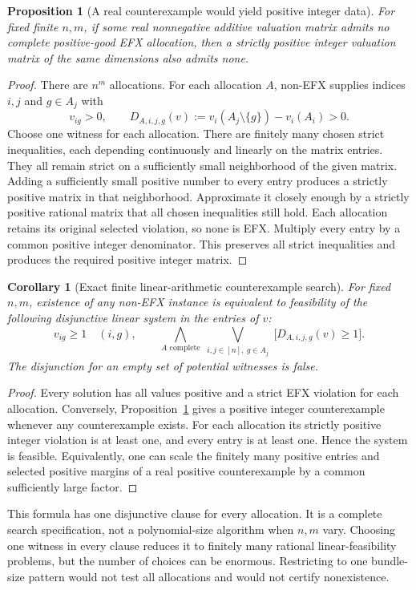 \documentclass[11pt,a4paper]{article}
\newtheorem{proposition}[theorem]{Proposition}
\newtheorem{corollary}[theorem]{Corollary}
\theoremstyle{definition}\newtheorem{definition}[theorem]{Definition}
\theoremstyle{remark}\newtheorem{remark}[theorem]{Remark}
\newcommand{\1}{\mathbf 1}
\begin{document}
\begin{proposition}[A real counterexample would yield positive integer data]\label{prop:integer}
For fixed finite $n,m$, if some real nonnegative additive valuation matrix admits no complete positive-good EFX allocation, then a strictly positive integer valuation matrix of the same dimensions also admits none.
\end{proposition}
\begin{proof}
There are $n^m$ allocations. For each allocation $A$, non-EFX supplies indices $i,j$ and $g\in A_j$ with
\[
 v_{ig}>0,\qquad D_{A,i,j,g}(v):=
 v_i(A_j\setminus\{g\})-v_i(A_i)>0.
\]
Choose one witness for each allocation. There are finitely many chosen strict inequalities, each depending continuously and linearly on the matrix entries. They all remain strict on a sufficiently small neighborhood of the given matrix. Adding a sufficiently small positive number to every entry produces a strictly positive matrix in that neighborhood. Approximate it closely enough by a strictly positive rational matrix that all chosen inequalities still hold. Each allocation retains its original selected violation, so none is EFX. Multiply every entry by a common positive integer denominator. This preserves all strict inequalities and produces the required positive integer matrix.
\end{proof}

\begin{corollary}[Exact finite linear-arithmetic counterexample search]\label{cor:search}
For fixed $n,m$, existence of any non-EFX instance is equivalent to feasibility of the following disjunctive linear system in the entries of $v$:
\[
 v_{ig}\ge1\quad(i,g),\qquad
 \bigwedge_{A\text{ complete}}
 \bigvee_{\substack{i,j\in[n],\ g\in A_j}}
 \bigl[D_{A,i,j,g}(v)\ge1\bigr].
\]
The disjunction for an empty set of potential witnesses is false.
\end{corollary}
\begin{proof}
Every solution has all values positive and a strict EFX violation for each allocation. Conversely, Proposition~\ref{prop:integer} gives a positive integer counterexample whenever any counterexample exists. For each allocation its strictly positive integer violation is at least one, and every entry is at least one. Hence the system is feasible. Equivalently, one can scale the finitely many positive entries and selected positive margins of a real positive counterexample by a common sufficiently large factor.
\end{proof}
This formula has one disjunctive clause for every allocation. It is a complete search specification, not a polynomial-size algorithm when $n,m$ vary. Choosing one witness in every clause reduces it to finitely many rational linear-feasibility problems, but the number of choices can be enormous. Restricting to one bundle-size pattern would not test all allocations and would not certify nonexistence.
\end{document}
